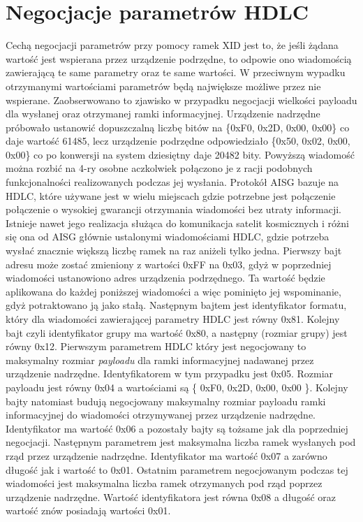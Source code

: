 \section{Negocjacje parametrów HDLC}
Cechą negocjacji parametrów przy pomocy ramek XID jest to, że jeśli żądana wartość jest wspierana przez
urządzenie podrzędne, to odpowie ono wiadomością zawierającą te same parametry oraz te same wartości. 
W przeciwnym wypadku otrzymanymi wartościami parametrów będą największe możliwe przez nie wspierane.
Zaobserwowano to zjawisko w przypadku negocjacji wielkości payloadu dla wysłanej oraz otrzymanej ramki informacyjnej.
Urządzenie nadrzędne próbowało ustanowić dopuszczalną liczbę bitów na \{0xF0, 0x2D, 0x00, 0x00\} co daje wartość 61485,
lecz urządzenie podrzędne odpowiedziało \{0x50, 0x02, 0x00, 0x00\} co po konwersji na system dziesiętny daje 20482 bity.
Powyższą wiadomość można rozbić na 4-ry osobne aczkolwiek połączono je z racji podobnych funkcjonalności realizowanych podczas jej wysłania.
Protokół AISG bazuje na HDLC, które używane jest w wielu miejscach
gdzie potrzebne jest połączenie połączenie o wysokiej gwarancji otrzymania wiadomości bez utraty informacji.
Istnieje nawet jego realizacja służąca do komunikacja satelit kosmicznych i różni się ona od AISG głównie
ustalonymi wiadomościami HDLC, gdzie potrzeba wysłać znacznie większą liczbę ramek na raz aniżeli tylko jedna.
Pierwszy bajt adresu może zostać zmieniony z wartości 0xFF na 0x03, gdyż w poprzedniej wiadomości ustanowiono adres urządzenia podrzędnego.
Ta wartość będzie aplikowana do każdej poniższej wiadomości a więc pominięto jej wspominanie,
gdyż potraktowano ją jako stałą.
Następnym bajtem jest identyfikator formatu, który dla wiadomości zawierającej parametry HDLC jest równy 0x81.
Kolejny bajt czyli identyfikator grupy ma wartość 0x80, a następny (rozmiar grupy) jest równy 0x12.
Pierwszym parametrem HDLC który jest negocjowany to maksymalny rozmiar \textit{payloadu} dla ramki informacyjnej nadawanej przez urządzenie nadrzędne.
Identyfikatorem w tym przypadku jest 0x05. Rozmiar payloadu jest równy 0x04 a wartościami są \{ 0xF0, 0x2D, 0x00, 0x00 \}.
Kolejny bajty natomiast budują negocjowany maksymalny rozmiar payloadu ramki informacyjnej do wiadomości otrzymywanej przez urządzenie nadrzędne.
Identyfikator ma wartość 0x06 a pozostały bajty są tożsame jak dla poprzedniej
negocjacji.
Następnym parametrem jest maksymalna liczba ramek wysłanych pod rząd przez urządzenie nadrzędne. Identyfikator ma wartość 0x07 a zarówno długość jak i wartość to 0x01.
Ostatnim parametrem negocjowanym podczas tej wiadomości jest maksymalna liczba ramek otrzymanych pod rząd poprzez urządzenie nadrzędne.
Wartość identyfikatora jest równa 0x08 a długość oraz wartość znów posiadają wartości 0x01.
